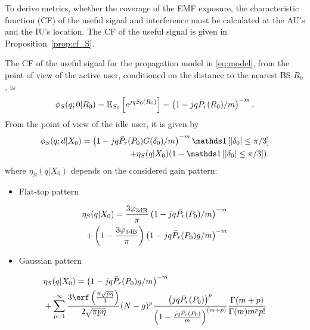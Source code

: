To derive metrics, whether the coverage of the EMF exposure, the characteristic function (CF) of the useful signal and interference must be calculated at the AU's and the IU's location. The CF of the useful signal is given in Proposition~\ref{prop:cf_S}.
\begin{proposition}\label{prop:cf_S}
    The CF of the useful signal for the propagation model in \eqref{eq:model}, from the point of view of the active user, conditioned on the distance to the nearest BS $R_0$, is
    \begin{equation}\label{eq:cfS0}
        \phi_S(q;0|R_0) = \mathbb E_{S_0}\left[e^{jq {S_0(R_0)}}\right] = \left(1-jq \Bar{P}_r(R_0)/m\right)^{-m}.
    \end{equation}
    From the point of view of the idle user, it is given by
    \begin{equation}\label{eq:cfSidle}
    \begin{split}
        \phi_S(q;d|X_0) = \left(1-jq \Bar{P}_r(P_0) G(\delta_0)/m\right)^{-m} \mathds 1\left[|\delta_0| \leq \pi/3\right] \\
        + \eta_S(q|X_0) (1-\mathds 1\left[|\delta_0| \leq \pi/3\right]).
    \end{split}
    \end{equation}
    where $\eta_S(q|X_0)$ depends on the considered gain pattern:
    \begin{itemize}
        \item {Flat-top pattern}
    \end{itemize} 
{\small
\begin{equation}\label{eq:eta_S_ft}
    \begin{split}
        \eta_S(q|X_0) =  \frac{3 \varphi_{3\textrm{\normalfont dB}}}{\pi}\left(1-jq \Bar{P}_r(P_0)/m\right)^{-m}\\
        + \left(1-\frac{3\varphi_{3\textrm{\normalfont dB}}}{\pi}\right) \left(1-jq \Bar{P}_r(P_0) g/m\right)^{-m}
    \end{split}
\end{equation}}

    \begin{itemize}
        \item {Gaussian pattern}
    \end{itemize} 
{\small
\begin{equation}\label{eq:eta_S_G}
\begin{split}
    &\eta_S(q|X_0) =  \left(1-jq \Bar{P}_r(P_0) g/m\right)^{-m}\\
    &+\sum\limits_{p=1}^\infty  \frac{3\erf\left(\tfrac{\pi \sqrt{p \eta}}{3}\right)}{2 \sqrt{\pi p \eta}} (N-g)^p \frac{\left(jq \Bar{P}_r(P_0)\right)^p}{\left(1-\frac{jq \Bar{P}_r(P_0)}{m}\right)^{(m+p)}}\frac{ \Gamma(m+p) }{\Gamma(m) m^p p!} 
\end{split}
\end{equation}}


\end{proposition}

